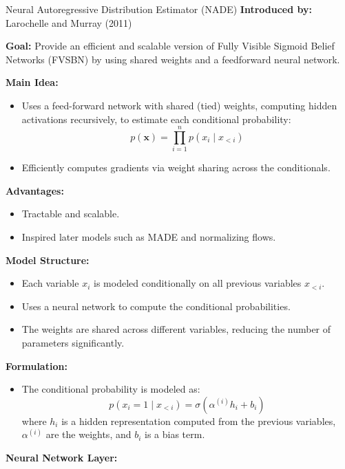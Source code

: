 \begin{frame}[allowframebreaks]{Neural Autoregressive Distribution Estimator (NADE)}
\textbf{Introduced by:} Larochelle and Murray (2011)

\textbf{Goal:} Provide an efficient and scalable version of Fully Visible Sigmoid Belief Networks (FVSBN) by using shared weights and a feedforward neural network.

\textbf{Main Idea:}
\begin{itemize}
    \item Uses a feed-forward network with shared (tied) weights, computing hidden activations recursively, to estimate each conditional probability:
    \vspace{-0.5em}
    \begin{equation*}
        p(\mathbf{x}) = \prod_{i=1}^n p(x_i \mid x_{<i})
    \end{equation*}
    \vspace{-0.5em}
    \item Efficiently computes gradients via weight sharing across the conditionals.
\end{itemize}

\textbf{Advantages:}
\begin{itemize}
    \item Tractable and scalable.
    \item Inspired later models such as MADE and normalizing flows.
\end{itemize}

\framebreak
\textbf{Model Structure:}
\begin{itemize}
    \item Each variable $x_i$ is modeled conditionally on all previous variables $x_{<i}$.
    \item Uses a neural network to compute the conditional probabilities.
    \item The weights are shared across different variables, reducing the number of parameters significantly.
\end{itemize}
\textbf{Formulation:}
\begin{itemize}
    \item The conditional probability is modeled as:
    \begin{equation*}
        p(x_i = 1 \mid x_{<i}) = \sigma(\alpha^{(i)} h_i + b_i)
    \end{equation*}
    where $h_i$ is a hidden representation computed from the previous variables, $\alpha^{(i)}$ are the weights, and $b_i$ is a bias term.
\end{itemize}
\textbf{Neural Network Layer:}


\end{frame}
